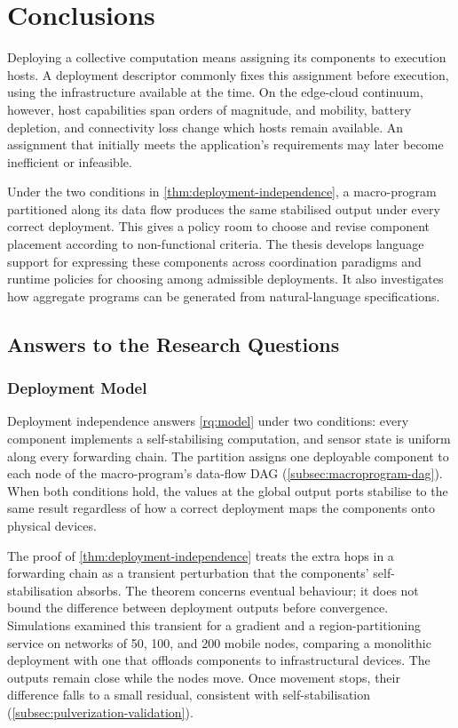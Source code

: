 \chapter{Conclusions}
\label{chap:conclusions}

Deploying a collective computation means assigning its components to execution hosts.
A deployment descriptor commonly fixes this assignment before execution,
using the infrastructure available at the time.
On the edge-cloud continuum, however, host capabilities span orders of magnitude,
and mobility, battery depletion, and connectivity loss change which hosts remain available.
An assignment that initially meets the application's requirements may later become inefficient or infeasible.

Under the two conditions in \cref{thm:deployment-independence},
a macro-program partitioned along its data flow produces the same stabilised output under every correct deployment.
%
This gives a policy room to choose and revise component placement according to non-functional criteria.
The thesis develops language support for expressing these components across coordination paradigms
and runtime policies for choosing among admissible deployments.
It also investigates how aggregate programs can be generated from natural-language specifications.

\section{Answers to the Research Questions}
\label{sec:rq-answers}

\subsection{Deployment Model}
\label{subsec:answer-model}

Deployment independence answers \cref{rq:model} under two conditions:
every component implements a self-stabilising computation,
and sensor state is uniform along every forwarding chain.
The partition assigns one deployable component to each node of the macro-program's data-flow \ac{DAG} (\cref{subsec:macroprogram-dag}).
When both conditions hold, the values at the global output ports stabilise to the same result
regardless of how a correct deployment maps the components onto physical devices.

The proof of \cref{thm:deployment-independence} treats the extra hops in a forwarding chain as a transient perturbation
that the components' self-stabilisation absorbs.
%
The theorem concerns eventual behaviour; it does not bound the difference between deployment outputs before convergence.
Simulations examined this transient for a gradient and a region-partitioning service
on networks of 50, 100, and 200 mobile nodes,
comparing a monolithic deployment with one that offloads components to infrastructural devices.
The outputs remain close while the nodes move.
Once movement stops, their difference falls to a small residual, consistent with self-stabilisation (\cref{subsec:pulverization-validation}).

